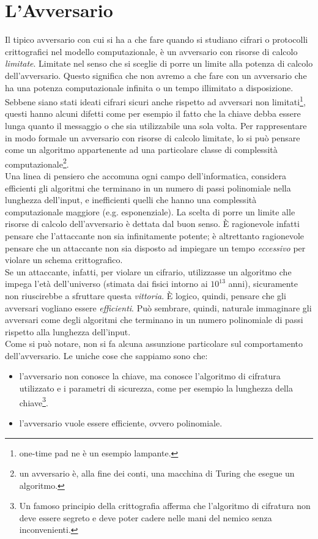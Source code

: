 \documentclass[a4paper,openright,twoside,12pt]{report}
\begin{document}
\section{L'Avversario}
Il tipico avversario con cui si ha a che fare quando si studiano cifrari o protocolli crittografici nel modello computazionale,
è un avversario con risorse di calcolo \emph{limitate}. Limitate nel senso che si sceglie di porre un limite alla potenza di calcolo dell'avversario.
Questo significa che non avremo a che fare con un avversario che ha una potenza computazionale infinita o un tempo illimitato a disposizione.\\
Sebbene siano stati ideati cifrari sicuri anche rispetto ad avversari non limitati\footnote{one-time pad ne \`e un esempio lampante.}, questi hanno alcuni difetti come per esempio
il fatto che la chiave debba essere lunga quanto il messaggio o che sia utilizzabile una sola volta.
Per rappresentare in modo formale un avversario con risorse di calcolo limitate, lo si può pensare come un algoritmo appartenente ad una 
particolare classe di complessit\`a computazionale\footnote{un avversario \`e, alla fine dei conti, una macchina di Turing che esegue un algoritmo.}. \\
Una linea di pensiero che accomuna ogni campo dell'informatica, considera efficienti gli algoritmi che terminano in un numero di passi polinomiale nella lunghezza dell'input, e inefficienti 
quelli che hanno una complessit\`a computazionale maggiore (e.g. esponenziale). 
La scelta di porre un limite alle risorse di calcolo dell'avversario \`e dettata dal buon senso.
\`E ragionevole infatti pensare che l'attaccante non sia infinitamente potente; \`e altrettanto ragionevole pensare che un attaccante non sia disposto ad impiegare un tempo \emph{eccessivo} per violare un schema crittografico.\\
Se un attaccante, infatti, per violare un cifrario, utilizzasse un algoritmo che impega l'et\`a dell'universo (stimata dai fisici intorno ai $10^{13}$ anni), sicuramente non riuscirebbe a sfruttare questa \emph{vittoria}.
\`E logico, quindi, pensare che gli avversari vogliano essere \emph{efficienti}.
Pu\`o sembrare, quindi, naturale immaginare gli avversari come degli algoritmi che terminano in un numero polinomiale di passi
rispetto alla lunghezza dell'input.\\Come si pu\`o notare, non si fa alcuna assunzione particolare sul comportamento dell'avversario. Le uniche cose che sappiamo sono che:
\begin{itemize}
 \item l'avversario non conosce la chiave, ma conosce l'algoritmo di cifratura utilizzato  e i parametri di sicurezza, come per esempio la lunghezza della chiave\footnote{Un famoso principio della crittografia afferma che
l'algoritmo di cifratura non deve essere segreto e deve poter cadere nelle mani del nemico senza inconvenienti.}. 
 \item l'avversario vuole essere efficiente, ovvero polinomiale.
\end{itemize}
\end{document}

